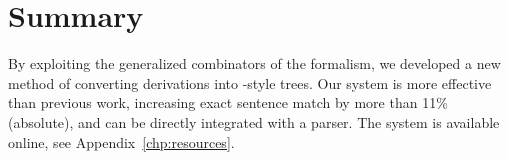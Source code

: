 \section{Summary}

By exploiting the generalized combinators of the \ccg formalism, we developed a new method of converting \ccg derivations into \ptb-style trees.
Our system is more effective than previous work, increasing exact sentence match by more than 11\% (absolute), and can be directly integrated with a \ccg parser.
The system is available online, see Appendix~\ref{chp:resources}.

